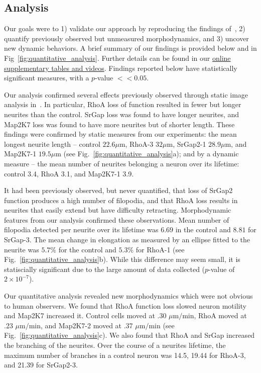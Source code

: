 \subsection{Analysis}
Our goals were to 1) validate our approach by reproducing the findings 
of~\cite{Pertz08}, 2) quantify previously observed but unmeasured morphodynamics,
and 3) uncover  new dynamic behaviors.
A brief summary of our findings is provided below and in 
Fig~\ref{fig:quantitative_analysis}. Further details can be found in our 
\href{http://www.kev-smith.com/ISBI2013/}{online supplementary tables and videos}.
Findings reported below have statistically significant measures,  with 
a $p$-value $<< 0.05$.


Our analysis confirmed several effects previously observed through static image
analysis  in~\cite{Pertz08}.  In  particular,  RhoA  loss  of  function
resulted in fewer but longer neurites than the control. SrGap loss was
found to have longer neurites, and  Map2K7 loss was found to have
more neurites but of shorter length.  These findings  were confirmed by 
static measures from
our experiments: the mean longest  neurite length -- control $22.6 \mu$m,
 RhoA-3 $32  \mu$m, SrGap2-1 $28.9 \mu$m,  and Map2K7-1 $19.5 \mu$m  
(see  Fig.~\ref{fig:quantitative_analysis}a);  and  by  a  dynamic
measure --  the mean  number of neurites  belonging a neuron  over its
lifetime: control 3.4, RhoA 3.1, and Map2K7-1 3.9.

It  had been previously observed, but  never quantified,  that  loss of
SrGap2 function  produces a  high number of  filopodia, and  that RhoA
loss  results  in neurites  that  easily  extend  but have  difficulty
retracting. Morphodynamic features from our analysis confirmed these
observations. Mean number of filopodia detected per  neurite over its lifetime was $6.69$
in the control  and $8.81$ for SrGap-3.%
The  mean change in elongation
as measured  by an ellipse fitted  to the neurite was  $5.7\%$ for the
control        and        $5.3\%$        for        RhoA-1        (see
Fig.~\ref{fig:quantitative_analysis}b).
While this difference may seem
small,  it is  statiscially significant due  to the  large amount  of  data collected
($p$-value of $2 \times 10^{-7}$).

Our quantitative analysis revealed new morphodynamics which
were not obvious to human  observers. We found that RhoA function loss
slowed  neuron motility and  Map2K7 increased  it.  Control cells
moved at  .30 $\mu  \text{m} / \text{min}$,  RhoA moved  at .23 $\mu  \text{m} /  \text{min}$, and
Map2K7-2     moved     at    .37     $\mu     \text{m}     /    \text{min}$     (see
Fig.~\ref{fig:quantitative_analysis}c).  We  also found that  RhoA and
SrGap  increased the  branching of  the
neurites.
Over the course
of a  neurites lifetime, the maximum  number of branches  in a control
neuron    was    14.5,   19.44    for    RhoA-3,    and   21.39    for
SrGap2-3.

